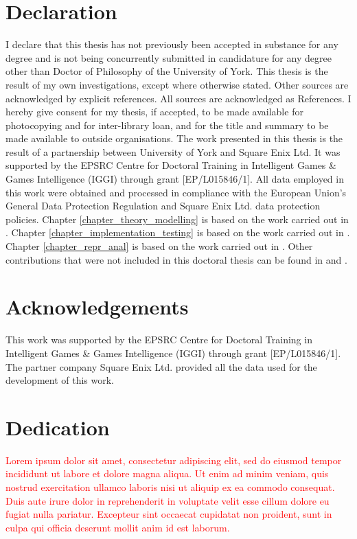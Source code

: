 \documentclass{yorkThesis}
\newcommand{\lorem}{\textcolor{red}{Lorem ipsum dolor sit amet, consectetur adipiscing elit, sed do eiusmod tempor incididunt ut labore et dolore magna aliqua. Ut enim ad minim veniam, quis nostrud exercitation ullamco laboris nisi ut aliquip ex ea commodo consequat. Duis aute irure dolor in reprehenderit in voluptate velit esse cillum dolore eu fugiat nulla pariatur. Excepteur sint occaecat cupidatat non proident, sunt in culpa qui officia deserunt mollit anim id est laborum.\\}}
\begin{document}
\chapter*{Declaration}
\label{declaration}
 I declare that this thesis has not previously been accepted in substance for any degree and is not being concurrently submitted in candidature for any degree other than Doctor of Philosophy of the University of York. This thesis is the result of my own investigations, except where otherwise stated. Other sources are acknowledged by explicit references. All sources are acknowledged as References. I hereby give consent for my thesis, if accepted, to be made available for photocopying and for inter-library loan, and for the title and summary to be made available to outside organisations. The work presented in this thesis is the result of a partnership between University of York and Square Enix Ltd. It was supported by the EPSRC Centre for Doctoral Training in Intelligent Games \& Games Intelligence (IGGI) through grant [EP/L015846/1]. All data employed in this work were obtained and processed in compliance with the European Union's General Data Protection Regulation \cite{EUdataregulations2018} and Square Enix Ltd. data protection policies. Chapter \ref{chapter_theory_modelling} is based on the work carried out in \cite{bonometti2020theory, bonometti2021approximating}. Chapter \ref{chapter_implementation_testing} is based on the work carried out in \cite{bonometti2019modelling, bonometti2020theory, bonometti2021approximating}. Chapter \ref{chapter_repr_anal} is based on the work carried out in \cite{bonometti2021approximating}. Other contributions that were not included in this doctoral thesis can be found in \cite{aung2018predicting} and \cite{vardal2022mind}.

\chapter*{Acknowledgements}
\label{acknowledgements}
This work was supported by the EPSRC Centre for Doctoral Training in Intelligent Games \& Games Intelligence (IGGI) through grant [EP/L015846/1]. The partner company Square Enix Ltd. provided all the data used for the development of this work.

\chapter*{Dedication}
\label{dedication}
\lorem
\end{document}
